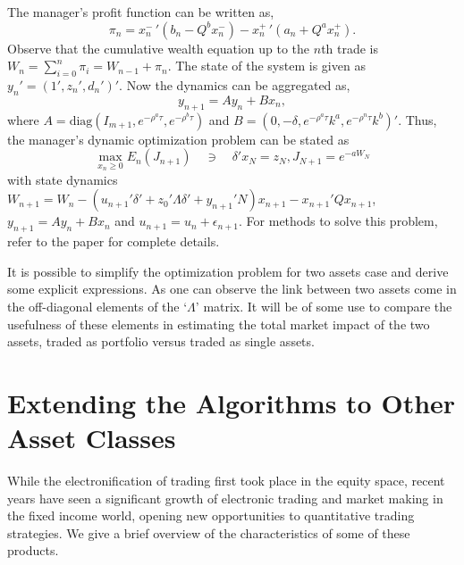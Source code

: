 The manager's profit function can be written as,
	\begin{equation}
	\pi_n= x_n^- \,' (b_n - Q^b x_n^-) - x_n^+\,' (a_n + Q^a x_n^+).
	\end{equation}
Observe that the cumulative wealth equation up to the $n$th trade is $W_n= \sum_{i=0}^n \pi_i= W_{n-1} + \pi_n$. The state of the system is given as $y_n'= (1', z_n', d_n')'$. Now the dynamics can be aggregated as,
	\begin{equation}
	y_{n+1} = A y_n + B x_n,
	\end{equation}
where $A= \text{diag}(I_{m+1}, e^{-\rho^a \tau}, e^{-\rho^b \tau})$ and $B= (0, -\delta, e^{-\rho^a\tau} k^a, e^{-\rho^n\tau} k^b)'$. Thus, the manager's dynamic optimization problem can be stated as
	\begin{equation}
	\max_{x_n \geq 0} E_n(J_{n+1}) \quad \ni \quad \delta' x_N= z_N, J_{N+1}= e^{-aW_N}
	\end{equation}
with state dynamics $W_{n+1}= W_n - (u_{n+1}' \delta' + z_0' \Lambda \delta' + y_{n+1}'N) x_{n+1} - x_{n+1}' Q x_{n+1}$, $y_{n+1}= Ay_n + Bx_n$ and $u_{n+1}= u_n + \epsilon_{n+1}$. For methods to solve this problem, refer to the paper for complete details. 


It is possible to simplify the optimization problem for two assets case and derive some explicit expressions. As one can observe the link between two assets come in the off-diagonal elements of the `$\Lambda$' matrix. It will be of some use to compare the usefulness of these elements in estimating the total market impact of the two assets, traded as portfolio versus traded as single assets. 



\section{Extending the Algorithms to Other Asset Classes\label{sec:ext_alg_other_asset}}

While the electronification of trading first took place in the equity space, recent years have seen a significant growth of electronic trading and market making in the fixed income world, opening new opportunities to quantitative trading strategies. We give a brief overview of the characteristics of some of these products. \twomedskip


